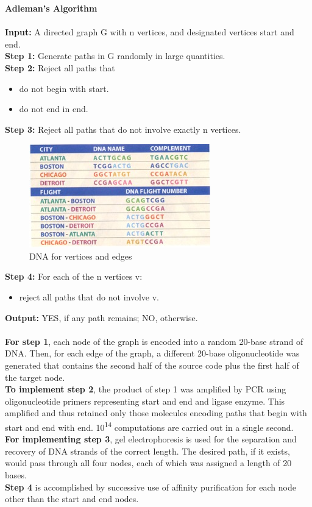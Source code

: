 \textbf{Adleman's Algorithm}
\\ \\ 
\textbf{Input:} A directed graph G with n vertices, and designated vertices start and end.
\\
\textbf{Step 1:} Generate paths in G randomly in large quantities.
\\
\textbf{Step 2:} Reject all paths that 
\begin{itemize}
  \item do not begin with start.  
  \item do not end in end.
\end{itemize}
\textbf{Step 3:} Reject all paths that do not involve exactly n vertices.
\\
\begin{figure}[h!]
    \centering
      \includegraphics[width=0.7\textwidth]{images/table}
      \caption{DNA for vertices and edges}
  \end{figure}
\hspace{-4.1pt}\textbf{Step 4:} For each of the n vertices v:
\begin{itemize}
  \item reject all paths that do not involve v.
\end{itemize}
\textbf{Output:} YES, if any path remains; NO, otherwise.
\\ \\ 
\textbf{For step 1}, each node of the graph is encoded into a random 20-base strand of DNA. Then, for each edge of the graph, a different 20-base  oligonucleotide  was  generated  that  contains  the  second  half  of  the source code plus the first half of the target node.
\\
\textbf{To implement step 2}, the product of step 1 was amplified by PCR using oligonucleotide  primers  representing start and end  and  ligase  enzyme. This  amplified  and  thus  retained  only  those  molecules  encoding  paths that  begin  with start and  end  with end. 10\textsuperscript{14} computations  are  carried out in a single second.
\\
\textbf{For   implementing   step   3}, gel   electrophoresis   is used for the  separation and recovery of DNA strands of the correct length. The desired path, if it exists, would pass through all four nodes, each of which was assigned a length of 20 bases.
\\
\textbf{Step  4} is  accomplished  by  successive  use  of  affinity  purification  for each node other than the start and end nodes.

